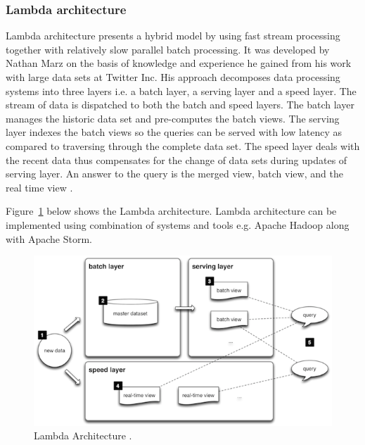 \subsubsection{ Lambda architecture}
Lambda architecture presents a hybrid model by using fast stream processing together with relatively slow parallel batch processing.  It was developed by Nathan Marz on the basis of knowledge and experience he gained from his work with large data sets at Twitter Inc. His approach decomposes data processing systems into three layers i.e. a batch layer, a serving layer and a speed layer. The stream of data is dispatched to both the batch and speed layers. The batch layer manages the historic data set and pre-computes the batch views. The serving layer indexes the batch views so the queries can be served with low latency as compared to traversing through the complete data set. The speed layer deals with the recent data thus compensates for the change of data sets during updates of serving layer. An answer to the query is the merged view, batch view, and the real time view \cite{marz2013big}\cite{lambdaarch}. 

Figure~\ref{fig:lambda} below shows the Lambda architecture. Lambda architecture can be implemented using combination of systems and tools e.g. Apache Hadoop along with Apache Storm.
\begin{figure}[ht]
  \begin{center}
    \includegraphics[width=\textwidth]{images/lambda.png}
    \caption{Lambda Architecture \cite{lambdaarch}.}
    \label{fig:lambda}
  \end{center}
\end{figure}

